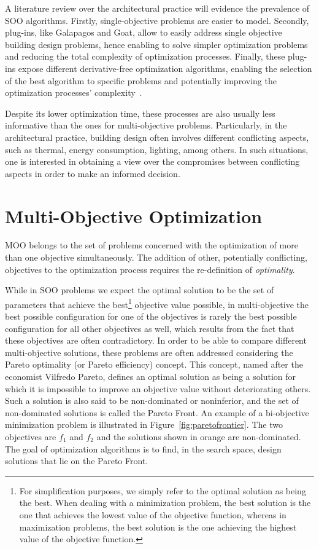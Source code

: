 A literature review over the architectural practice will evidence the prevalence of \ac{SOO} algorithms. Firstly, single-objective problems are easier to model. Secondly, plug-ins, like Galapagos and Goat, allow to easily address single objective building design problems, hence enabling to solve simpler optimization problems and reducing the total complexity of optimization processes. Finally, these plug-ins expose different derivative-free optimization algorithms, enabling the selection of the best algorithm to specific problems and potentially improving the optimization processes' complexity~\cite{Wortmann2016BBO}. 
			
Despite its lower optimization time, these processes are also usually less informative than the ones for multi-objective problems. Particularly, in the architectural practice, building design often involves different conflicting aspects, such as thermal, energy consumption, lighting, among others. In such situations, one is interested in obtaining a view over the compromises between conflicting aspects in order to make an informed decision.
	
\section{Multi-Objective Optimization}

\ac{MOO} belongs to the set of problems concerned with the optimization of more than one objective simultaneously. The addition of other, potentially conflicting, objectives to the optimization process requires the re-definition of \textit{optimality}. 

While in \ac{SOO} problems we expect the optimal solution to be the set of parameters that achieve the best\footnote{For simplification purposes, we simply refer to the optimal solution as being the best. When dealing with a minimization problem, the best solution is the one that achieves the lowest value of the objective function, whereas in maximization problems, the best solution is the one achieving the highest value of the objective function.} objective value possible, in multi-objective the best possible configuration for one of the objectives is rarely the best possible configuration for all other objectives as well, which results from the fact that these objectives are often contradictory. In order to be able to compare different multi-objective solutions, these problems are often addressed considering the Pareto optimality (or Pareto efficiency) concept. This concept, named after the economist Vilfredo Pareto, defines an optimal solution as being a solution for which it is impossible to improve an objective value without deteriorating others. Such a solution is also said to be non-dominated or noninferior, and the set of non-dominated solutions is called the Pareto Front. An example of a bi-objective minimization problem is illustrated in Figure~\ref{fig:paretofrontier}. The two objectives are $f_1$ and $f_2$ and the solutions shown in orange are non-dominated. The goal of optimization algorithms is to find, in the search space, design solutions that lie on the Pareto Front.

